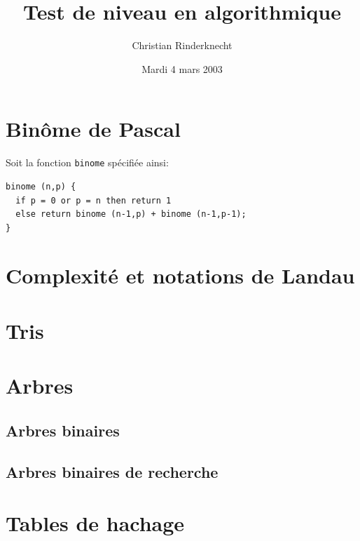 \documentclass[11pt, a4paper]{article}
\title{Test de niveau en algorithmique}
\author{Christian Rinderknecht}
\date{Mardi 4 mars 2003}
\begin{document}
\maketitle

\section{Binôme de Pascal}

\noindent Soit la fonction \verb+binome+ spécifiée ainsi:

\begin{verbatim}
binome (n,p) {
  if p = 0 or p = n then return 1
  else return binome (n-1,p) + binome (n-1,p-1);
}
\end{verbatim}



\section{Complexité et notations de Landau}




\section{Tris}




\section{Arbres}

  \subsection{Arbres binaires}

  
  

  \subsection{Arbres binaires de recherche}

  
  

\section{Tables de hachage}



\end{document}
